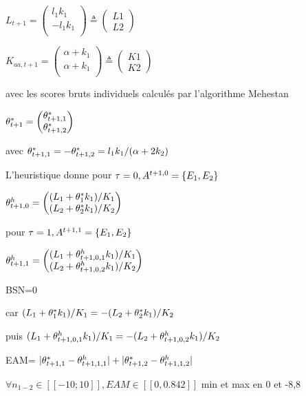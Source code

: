 $L_{t+1}= \begin{pmatrix}
l_1 k_1\\
-l_1 k_1 \\
\end{pmatrix} \triangleq
\begin{pmatrix}
L1\\
L2
\end{pmatrix} 
$

$K_{aa,t+1}= \begin{pmatrix}
\alpha + k_1\\
\alpha +  k_1\\
\end{pmatrix} \triangleq
\begin{pmatrix}
K1\\
K2
\end{pmatrix} 
$

avec les scores bruts individuels calculés par l'algorithme Mehestan

$\theta^*_{t+1}= \begin{pmatrix}
\theta^*_{t+1,1} \\
\theta^*_{t+1,2} 
\end{pmatrix}$

avec $\theta^*_{t+1,1}  = -\theta^*_{t+1,2} = l_1 k_1/(\alpha+2 k_2)$

L'heuristique donne pour $\tau=0, A^{t+1,0}=\left\lbrace E_1,E_2 \right\rbrace$

$ \theta^h_{t+1,0}= \begin{pmatrix}
(L_1+\theta^*_{1} k_1) / K_1 \\
(L_2+\theta^*_{2} k_1) / K_2
\end{pmatrix}$

pour $\tau=1, A^{t+1,1}=\left\lbrace E_1,E_2 \right\rbrace$

$ \theta^h_{t+1,1}= \begin{pmatrix}
(L_1+\theta^h_{t+1,0,1} k_1) / K_1 \\
(L_2+\theta^h_{t+1,0,2} k_1) / K_2
\end{pmatrix}$


BSN=0

car  $(L_1+\theta^*_{1} k_1) / K_1 =
-(L_2+\theta^*_{2} k_1) / K_2$

puis 
$(L_1+\theta^h_{t+1,0,1} k_1) / K_1 =
-(L_2+\theta^h_{t+1,0,2} k_1) / K_2 $

EAM=  $|\theta^*_{t+1,1} - \theta^h_{t+1,1,1}|   +  |\theta^*_{t+1,2} - \theta^h_{t+1,1,2}| $

$\forall{n_{1-2}}\in [\![-10;10]\!], EAM \in [\![0,0.842]\!]$ 
min et max en 0 et {-8,8}

